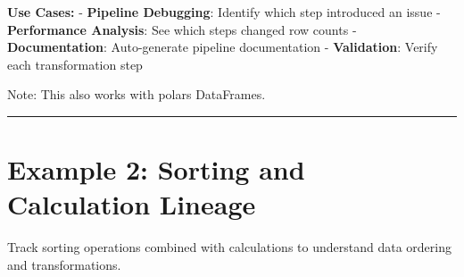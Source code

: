 \documentclass[
  letterpaper,
]{scrbook}
\begin{document}
\textbf{Use Cases:} - \textbf{Pipeline Debugging}: Identify which step
introduced an issue - \textbf{Performance Analysis}: See which steps
changed row counts - \textbf{Documentation}: Auto-generate pipeline
documentation - \textbf{Validation}: Verify each transformation step

Note: This also works with polars DataFrames.

\begin{center}\rule{0.5\linewidth}{0.5pt}\end{center}

\section{Example 2: Sorting and Calculation
Lineage}\label{example-2-sorting-and-calculation-lineage}

Track sorting operations combined with calculations to understand data
ordering and transformations.
\end{document}
